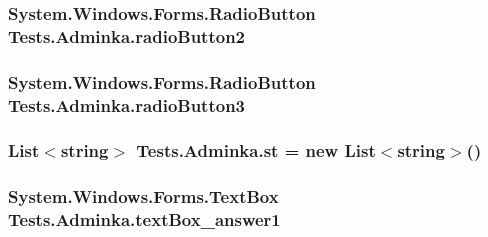 \subsubsection[{\texorpdfstring{radio\+Button2}{radioButton2}}]{\setlength{\rightskip}{0pt plus 5cm}System.\+Windows.\+Forms.\+Radio\+Button Tests.\+Adminka.\+radio\+Button2\hspace{0.3cm}{\ttfamily [private]}}\hypertarget{class_tests_1_1_adminka_aa749fca4eac152a213b3e82e9e530374}{}\label{class_tests_1_1_adminka_aa749fca4eac152a213b3e82e9e530374}
\subsubsection[{\texorpdfstring{radio\+Button3}{radioButton3}}]{\setlength{\rightskip}{0pt plus 5cm}System.\+Windows.\+Forms.\+Radio\+Button Tests.\+Adminka.\+radio\+Button3\hspace{0.3cm}{\ttfamily [private]}}\hypertarget{class_tests_1_1_adminka_a9c6475158496e79903d5f8b432b697a4}{}\label{class_tests_1_1_adminka_a9c6475158496e79903d5f8b432b697a4}
\subsubsection[{\texorpdfstring{st}{st}}]{\setlength{\rightskip}{0pt plus 5cm}List$<$string$>$ Tests.\+Adminka.\+st = new List$<$string$>$()\hspace{0.3cm}{\ttfamily [private]}}\hypertarget{class_tests_1_1_adminka_a330050adb0204a625889fb83a3076020}{}\label{class_tests_1_1_adminka_a330050adb0204a625889fb83a3076020}
\subsubsection[{\texorpdfstring{text\+Box\+\_\+answer1}{textBox_answer1}}]{\setlength{\rightskip}{0pt plus 5cm}System.\+Windows.\+Forms.\+Text\+Box Tests.\+Adminka.\+text\+Box\+\_\+answer1\hspace{0.3cm}{\ttfamily [private]}}\hypertarget{class_tests_1_1_adminka_a6ddfc84b04cb9ee0da0d214993156a13}{}\label{class_tests_1_1_adminka_a6ddfc84b04cb9ee0da0d214993156a13}
